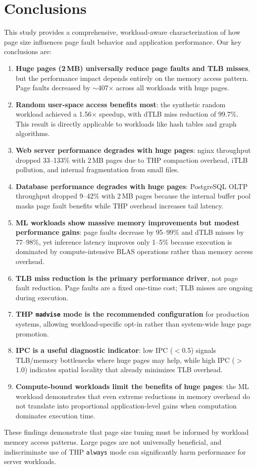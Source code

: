 \documentclass[conference]{IEEEtran}
\begin{document}
\section{Conclusions}

This study provides a comprehensive, workload-aware characterization of how page size influences page fault behavior and application performance. Our key conclusions are:

\begin{enumerate}
    \item \textbf{Huge pages (2\,MB) universally reduce page faults and TLB misses}, but the performance impact depends entirely on the memory access pattern. Page faults decreased by $\sim$407$\times$ across all workloads with huge pages.

    \item \textbf{Random user-space access benefits most}: the synthetic random workload achieved a 1.56$\times$ speedup, with dTLB miss reduction of 99.7\%. This result is directly applicable to workloads like hash tables and graph algorithms.

    \item \textbf{Web server performance degrades with huge pages}: nginx throughput dropped 33--133\% with 2\,MB pages due to THP compaction overhead, iTLB pollution, and internal fragmentation from small files.

    \item \textbf{Database performance degrades with huge pages}: PostgreSQL OLTP throughput dropped 9--42\% with 2\,MB pages because the internal buffer pool masks page fault benefits while THP overhead increases tail latency.

    \item \textbf{ML workloads show massive memory improvements but modest performance gains}: page faults decrease by 95--99\% and dTLB misses by 77--98\%, yet inference latency improves only 1--5\% because execution is dominated by compute-intensive BLAS operations rather than memory access overhead.

    \item \textbf{TLB miss reduction is the primary performance driver}, not page fault reduction. Page faults are a fixed one-time cost; TLB misses are ongoing during execution.

    \item \textbf{THP \texttt{madvise} mode is the recommended configuration} for production systems, allowing workload-specific opt-in rather than system-wide huge page promotion.

    \item \textbf{IPC is a useful diagnostic indicator}: low IPC ($<$0.5) signals TLB/memory bottlenecks where huge pages may help, while high IPC ($>$1.0) indicates spatial locality that already minimizes TLB overhead.

    \item \textbf{Compute-bound workloads limit the benefits of huge pages}: the ML workload demonstrates that even extreme reductions in memory overhead do not translate into proportional application-level gains when computation dominates execution time.
\end{enumerate}

These findings demonstrate that page size tuning must be informed by workload memory access patterns. Large pages are not universally beneficial, and indiscriminate use of THP \texttt{always} mode can significantly harm performance for server workloads.
\end{document}
